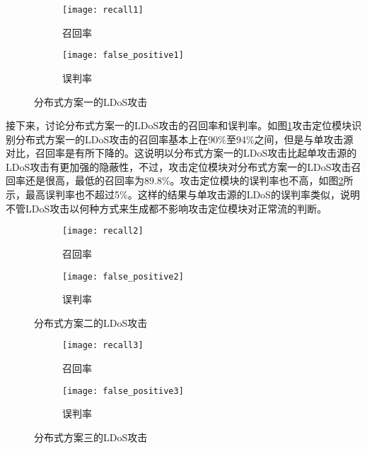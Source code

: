 \begin{figure}
    \begin{subfigure}{.49\textwidth}
        \centering
        \texttt{[image: recall1]}
        \caption{召回率}
        \label{fig:recall1}
    \end{subfigure}
    \begin{subfigure}{.49\textwidth}
        \centering
        \texttt{[image: false\_positive1]}
        \caption{误判率}
        \label{fig:false-positive1}
    \end{subfigure}
    \caption{分布式方案一的LDoS攻击}
    \label{fig:accuracy-2h-mod1}
\end{figure}

接下来，讨论分布式方案一的LDoS攻击的召回率和误判率。如图\ref{fig:recall1}攻击定位模块识别分布式方案一的LDoS攻击的召回率基本上在90\%至94\%之间，但是与单攻击源对比，召回率是有所下降的。这说明以分布式方案一的LDoS攻击比起单攻击源的LDoS攻击有更加强的隐蔽性，不过，攻击定位模块对分布式方案一的LDoS攻击召回率还是很高，最低的召回率为89.8\%。攻击定位模块的误判率也不高，如图\ref{fig:false-positive1}所示，最高误判率也不超过5\%。这样的结果与单攻击源的LDoS的误判率类似，说明不管LDoS攻击以何种方式来生成都不影响攻击定位模块对正常流的判断。

\begin{figure}
    \begin{subfigure}{.49\textwidth}
        \centering
        \texttt{[image: recall2]}
        \caption{召回率}
        \label{fig:recall2}
    \end{subfigure}
    \begin{subfigure}{.49\textwidth}
        \centering
        \texttt{[image: false\_positive2]}
        \caption{误判率}
        \label{fig:false-positive2}
    \end{subfigure}
    \caption{分布式方案二的LDoS攻击}
    \label{fig:accuracy-2h-mod2}
\end{figure}

\begin{figure}
    \begin{subfigure}{.49\textwidth}
        \centering
        \texttt{[image: recall3]}
        \caption{召回率}
        \label{fig:recall3}
    \end{subfigure}
    \begin{subfigure}{.49\textwidth}
        \centering
        \texttt{[image: false\_positive3]}
        \caption{误判率}
        \label{fig:false-positive3}
    \end{subfigure}
    \caption{分布式方案三的LDoS攻击}
    \label{fig:accuracy-2h-mod3}
\end{figure}


